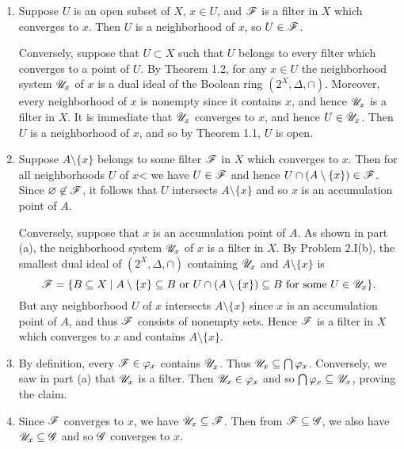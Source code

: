 \begin{prob}[Filters]
\begin{enumerate}
\item Suppose $U$ is an open subset of $X$, $x \in U$, and $\mathscr{F}$ is a filter in $X$ which converges to $x$. Then $U$ is a neighborhood of $x$, so $U \in \mathscr{F}$.

Conversely, suppose that $U \subset X$ such that $U$ belongs to every filter which converges to a point of $U$. By Theorem 1.2, for any $x \in U$ the neighborhood system $\mathscr{U}_x$ of $x$ is a dual ideal of the Boolean ring $(2^X, \Delta, \cap)$. Moreover, every neighborhood of $x$ is nonempty since it contains $x$, and hence $\mathscr{U}_x$ is a filter in $X$. It is immediate that $\mathscr{U}_x$ converges to $x$, and hence $U \in \mathscr{U}_x$. Then $U$ is a neighborhood of $x$, and so by Theorem 1.1, $U$ is open.

\item Suppose $A\setminus\{x\}$ belongs to some filter $\mathscr{F}$ in $X$ which converges to $x$. Then for all neighborhoods $U$ of $x$< we have $U \in \mathscr{F}$ and hence $U\cap(A\setminus\{x\}) \in \mathscr{F}$. Since $\varnothing\not\in\mathscr{F}$, it follows that $U$ intersects $A\setminus\{x\}$ and so $x$ is an accumulation point of $A$.

Conversely, suppose that $x$ is an accumulation point of $A$. As shown in part (a), the neighborhood system $\mathscr{U}_x$ of $x$ is a filter in $X$. By Problem 2.I(b), the smallest dual ideal of $(2^X, \Delta, \cap)$ containing $\mathscr{U}_x$ and $A\setminus\{x\}$ is \[\mathscr{F} = \{B \subseteq X\mid A\setminus\{x\} \subseteq B\text{ or } U\cap(A\setminus\{x\}) \subseteq B\text{ for some }U \in \mathscr{U}_x\}.\] But any neighborhood $U$ of $x$ intersects $A\setminus\{x\}$ since $x$ is an accumulation point of $A$, and thus $\mathscr{F}$ consists of nonempty sets. Hence $\mathscr{F}$ is a filter in $X$ which converges to $x$ and contains $A\setminus\{x\}$.

\item By definition, every $\mathscr{F} \in \varphi_x$ contains $\mathscr{U}_x$. Thus $\mathscr{U}_x \subseteq \bigcap\varphi_x$. Conversely, we saw in part (a) that $\mathscr{U}_x$ is a filter. Then $\mathscr{U}_x \in \varphi_x$ and so $\bigcap\varphi_x \subseteq \mathscr{U}_x$, proving the claim.

\item Since $\mathscr{F}$ converges to $x$, we have $\mathscr{U}_x \subseteq \mathscr{F}$. Then from $\mathscr{F} \subseteq \mathscr{G}$, we also have $\mathscr{U}_x \subseteq \mathscr{G}$ and so $\mathscr{G}$ converges to $x$.


\end{enumerate}
\end{prob}
